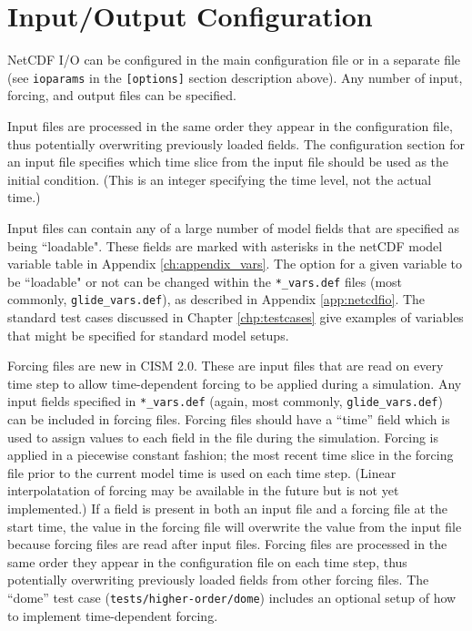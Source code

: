 \section{Input/Output Configuration}
\label{io-config}

NetCDF I/O can be configured in the main configuration file or in a separate file 
(see \texttt{ioparams} in the \texttt{[options]} section description above). 
Any number of input, forcing, and output files can be specified. 

Input files are processed in the same order they appear in the configuration file, 
thus potentially overwriting previously loaded fields.  The configuration section 
for an input file specifies which time slice from the input file should be used as
the initial condition.  (This is an integer specifying the time level, not
the actual time.)

Input files can contain any of a large number of model fields that are specified as being
``loadable". These fields are marked with asterisks in the netCDF model variable
table in Appendix \ref{ch:appendix_vars}. The option for a given variable to be ``loadable" 
or not can be changed within the \texttt{*\_vars.def} files (most commonly, \texttt{glide\_vars.def}),
as described in Appendix \ref{app:netcdfio}. 
The standard test cases discussed in Chapter \ref{chp:testcases} give examples
of variables that might be specified for standard model setups.    

Forcing files are new in CISM 2.0.  These are input files that are read on every 
time step to allow time-dependent
forcing to be applied during a simulation.  Any input fields specified in
\texttt{*\_vars.def} (again, most commonly, \texttt{glide\_vars.def}) can be included
in forcing files.  Forcing files should have a ``time'' field which is used to 
assign values to each field in the file during the simulation.  Forcing is applied 
in a piecewise constant fashion; the most recent time slice in the forcing file prior
to the current model time is used on each time step.  (Linear interpolatation of
forcing may be available in the future but is not yet implemented.)
If a field is present in both an input file and a
forcing file at the start time, the value in the forcing file will overwrite the value
from the input file because forcing files are read after input files.
Forcing files are processed in the same order they appear in the configuration file on each time step, 
thus potentially overwriting previously loaded fields from other
forcing files.  The ``dome'' test case (\texttt{tests/higher-order/dome}) includes 
an optional setup of how to implement time-dependent forcing.

